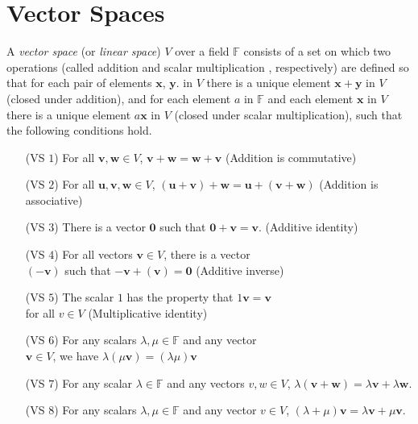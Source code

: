 \section{Vector Spaces}

\begin{defi}
    A \emph{vector space} (or \emph{linear space}) $V$ over a field $\mathbb{F}$
    consists of a set on whicb two operations (called addition and scalar
    multiplication , respectively) are defined so that for each pair of elements
    $\mathbf{x}$, $\mathbf{y}$. in $V$ there is a unique element $\mathbf{x +
    y}$ in $V$ (closed under addition), and for each element $a$ in $\mathbb{F}$
    and each element $\mathbf{x}$ in $V$ there is a unique element $a\mathbf{x}$
    in $V$ (closed under scalar multiplication), such that the following
    conditions hold. 
    \begin{enumerate}
        \item[(VS $1$)] For all $\mathbf{v}, \mathbf{w} \in V$, $\mathbf{v} + \mathbf{w} = \mathbf{w} + \mathbf{v}$ \hfill
        (Addition is commutative)
        \item[(VS $2$)]  For all $\mathbf{u}, \mathbf{v}, \mathbf{w} \in V$, $(\mathbf{u} +
        \mathbf{v}) + \mathbf{w} = \mathbf{u} + (\mathbf{v} + \mathbf{w})$
        \hfill (Addition is associative)
        \item[(VS $3$)] There is a vector $\mathbf{0}$ such that $\mathbf{0}+\mathbf{v}
        = \mathbf{v}$. \hfill (Additive identity)
        \item[(VS $4$)] For all vectors $\mathbf{v}\in V$, there is a vector \\
        $(-\mathbf{v})$ such that $\mathbf{-v}
        + (\mathbf{v}) = \mathbf{0}$ \hfill (Additive inverse)
        \item[(VS $5$)] The scalar $1$ has the property that $1\mathbf{v} = \mathbf{v}$ \\
        for all $v \in V$ \hfill (Multiplicative identity)
        \item[(VS $6$)] For any scalars $\lambda, \mu \in \mathbb{F}$ and any vector \\
        $\mathbf{v} \in V$, we have $\lambda(\mu\mathbf{v}) =
        (\lambda\mu)\mathbf{v}$ \hfill 
        \item[(VS $7$)] For any scalar $\lambda \in \mathbb{F}$ and any vectors
        $v, w \in V$, $\lambda(\mathbf{v + w}) = \lambda\mathbf{v} + \lambda\mathbf{w}$.
        \item[(VS $8$)]For any scalars $\lambda, \mu \in \mathbb{F}$ and any vector $v \in
        V$, $(\lambda + \mu)\mathbf{v} = \lambda\mathbf{v} + \mu\mathbf{v}$.
    \end{enumerate}
\end{defi}